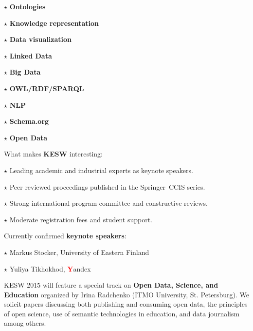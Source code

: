 \documentclass[a4paper, 10pt]{article}
\renewcommand{\skip}{\vspace{1ex}}
\renewcommand{\bullet}{\ensuremath{\star} }
\begin{document}
\hspace*{-\parindent}%
\begin{minipage}[t]{.38\textwidth}
\noindent
\bullet \textbf{Ontologies}

\bullet \textbf{Knowledge representation}

\bullet \textbf{Data visualization}

\end{minipage}
\hfill
\begin{minipage}[t]{.30\textwidth}

\bullet \textbf{Linked Data}

\bullet \textbf{Big Data}

\bullet\textbf{OWL/RDF/SPARQL}

\end{minipage}
\hfill
\begin{minipage}[t]{.28\textwidth}

\bullet \textbf{NLP}

\bullet \textbf{Schema.org}

\bullet \textbf{Open Data}

\end{minipage}

\skip
\skip


\noindent What makes \textbf{KESW} interesting:

\skip\skip

\noindent\bullet Leading academic and industrial experts as keynote speakers.

\noindent\bullet Peer reviewed proceedings published in the Springer~CCIS
series.

\noindent\bullet Strong international program committee and constructive reviews.

\noindent\bullet Moderate registration fees and student support.

\skip\skip


\noindent Currently confirmed \textbf{keynote speakers}:

\noindent\bullet Markus Stocker, University of Eastern Finland

\noindent\bullet Yuliya Tikhokhod, \textcolor{red}{\textbf{Y}}andex

\skip\skip

\noindent 
KESW 2015 will feature a special track on \textbf{Open Data, Science, and
Education} organized by Irina Radchenko (ITMO University, St. Petersburg). We
solicit papers discussing both publishing and consuming open data,
the principles of open science, use of semantic technologies in education, and data
journalism among others.
\end{document}
